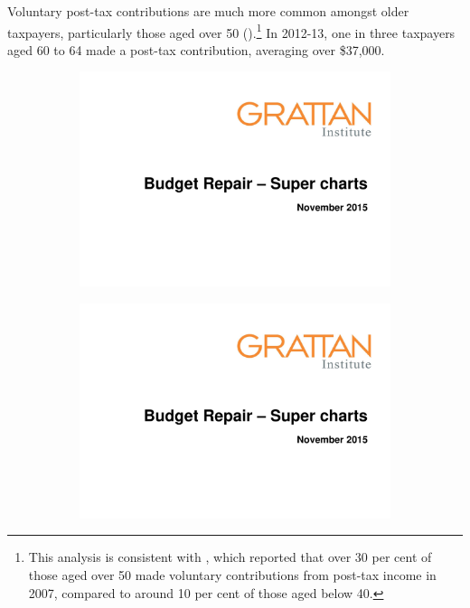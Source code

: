 \begin{subappendices}
 
Voluntary post-tax contributions are much more common amongst older taxpayers, particularly those aged over 50 ().\footnote{This analysis is consistent with \textcite[][16]{FengGerransClark2014}, which reported that over 30 per cent of those aged over 50 made voluntary contributions from post-tax income in 2007, compared to around 10 per cent of those aged below 40.}  In 2012-13, one in three taxpayers aged 60 to 64 made a post-tax contribution, averaging over \$37,000. 

\addtocounter{figure}{-1}

\begin{figure}
\caption{Who is more likely to make larger post-tax contributions\label{fig:SUPER-A-11--12}}%
\begin{subfigure}{\columnwidth}
\includegraphics[width=\columnwidth,page=45]{super-atlas/PPTX.pdf}
\end{subfigure}
\hfill
\begin{subfigure}{\columnwidth}
\includegraphics[width=\columnwidth,page=46]{super-atlas/PPTX.pdf}
\end{subfigure}


\end{figure}
\end{subappendices}
